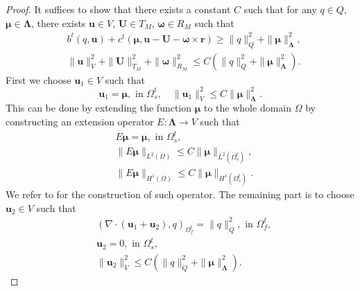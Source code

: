 \documentclass{article}
\newcommand{\bU}{{\mathbf{U}}}
\newcommand{\bu}{{\mathbf{u}}}
\newcommand{\bomega}{{\boldsymbol{\omega}}}
\begin{document}
\begin{proof}
    It suffices to show that there exists a constant $C$ such that for any ${q}\in Q$, ${\boldsymbol{\mu}}\in \boldsymbol{\Lambda}$, there exists $\bu\in V$, ${\bU}\in T_M$, ${\bomega}\in R_M$ such that
    \begin{equation}
        \begin{aligned}
        &{b}^t({q},\bu)+{c}^t({\boldsymbol{\mu}},\bu - {\bU} - {\bomega}\times\mathbf{r}) \geq \|{q}\|_Q^2+\|{\boldsymbol{\mu}}\|_{\boldsymbol{\Lambda}}^2,\\
        &\|\bu\|_V^2 + \|{\bU}\|_{T_M}^2 + \|{\bomega}\|_{R_M}^2 \leq C(\|{q}\|_Q^2 + \|{\boldsymbol{\mu}}\|_{\boldsymbol{\Lambda}}^2).
        \end{aligned}
    \end{equation}
    First we choose $\bu_1 \in V$ such that 
    \begin{equation} 
        \bu_1 = \boldsymbol{\mu}, \text{ in } \Omega_s^t, \quad \|\bu_1\|_V^2 \leq C\|\boldsymbol{\mu}\|_{\boldsymbol{\Lambda}}^2.
    \end{equation}
    This can be done by extending the function $\boldsymbol{\mu}$ to the whole domain $\Omega$ by constructing an extension operator $E:\boldsymbol{\Lambda}\to V$ such that 
    \begin{equation}
        \begin{aligned}
            &E \boldsymbol{\mu} = \boldsymbol{\mu}, \text{ in }\Omega_s^t,\\
            &\|E\boldsymbol{\mu}\|_{L^2(\Omega)}\leq C \|\boldsymbol{\mu}\|_{L^2(\Omega_s^t)},\\
            &\|E\boldsymbol{\mu}\|_{H^1(\Omega)}\leq C\|\boldsymbol{\mu}\|_{H^1(\Omega_s^t)}.
        \end{aligned}
    \end{equation} We refer to \cite{evans2022partial} for the construction of such operator. The remaining part is to choose $\bu_2\in V$ such that
    \begin{equation}
        \begin{aligned}\label{cond:bu2}
            &(\nabla\cdot(\bu_1+\bu_2),q)_{\Omega_f^t} = \|q\|_Q^2, \text{ in } \Omega_f^t,\\
            &\bu_2 = 0, \text{ in } \Omega_s^t,\\
            &\|\bu_2\|_V^2 \leq C(\|{q}\|_Q^2 + \|{\boldsymbol{\mu}}\|_{\boldsymbol{\Lambda}}^2).
        \end{aligned}
    \end{equation}

\end{proof}
\end{document}
